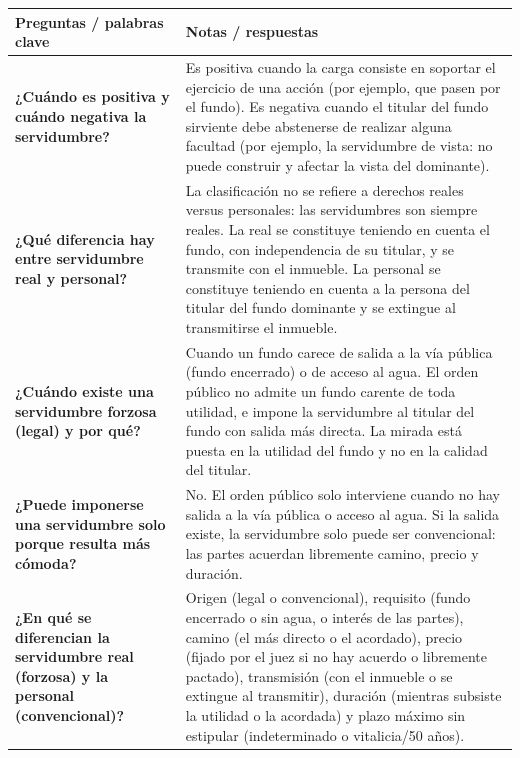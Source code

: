\documentclass[12pt,oneside]{book}
\begin{document}
\begin{table}[H]
\centering
\begin{tabularx}{\textwidth}{
    !{\vrule width 0.4pt}>{\raggedright\arraybackslash}p{0.26\textwidth}
    !{\vrule width 0.4pt}>{\raggedright\arraybackslash}X
    !{\vrule width 0.4pt}
}
\toprule
\textbf{Preguntas / palabras clave} &
\textbf{Notas / respuestas} \\
\midrule

\textbf{¿Cuándo es positiva y cuándo negativa la servidumbre?} &
Es positiva cuando la carga consiste en soportar el ejercicio de una acción (por ejemplo, que pasen por el fundo). Es negativa cuando el titular del fundo sirviente debe abstenerse de realizar alguna facultad (por ejemplo, la servidumbre de vista: no puede construir y afectar la vista del dominante). \\

\textbf{¿Qué diferencia hay entre servidumbre real y personal?} &
La clasificación no se refiere a derechos reales versus personales: las servidumbres son siempre reales. La real se constituye teniendo en cuenta el fundo, con independencia de su titular, y se transmite con el inmueble. La personal se constituye teniendo en cuenta a la persona del titular del fundo dominante y se extingue al transmitirse el inmueble. \\

\textbf{¿Cuándo existe una servidumbre forzosa (legal) y por qué?} &
Cuando un fundo carece de salida a la vía pública (fundo encerrado) o de acceso al agua. El orden público no admite un fundo carente de toda utilidad, e impone la servidumbre al titular del fundo con salida más directa. La mirada está puesta en la utilidad del fundo y no en la calidad del titular. \\

\textbf{¿Puede imponerse una servidumbre solo porque resulta más cómoda?} &
No. El orden público solo interviene cuando no hay salida a la vía pública o acceso al agua. Si la salida existe, la servidumbre solo puede ser convencional: las partes acuerdan libremente camino, precio y duración. \\

\textbf{¿En qué se diferencian la servidumbre real (forzosa) y la personal (convencional)?} &
Origen (legal o convencional), requisito (fundo encerrado o sin agua, o interés de las partes), camino (el más directo o el acordado), precio (fijado por el juez si no hay acuerdo o libremente pactado), transmisión (con el inmueble o se extingue al transmitir), duración (mientras subsiste la utilidad o la acordada) y plazo máximo sin estipular (indeterminado o vitalicia/50 años). \\


\end{tabularx}
\end{table}
\end{document}

